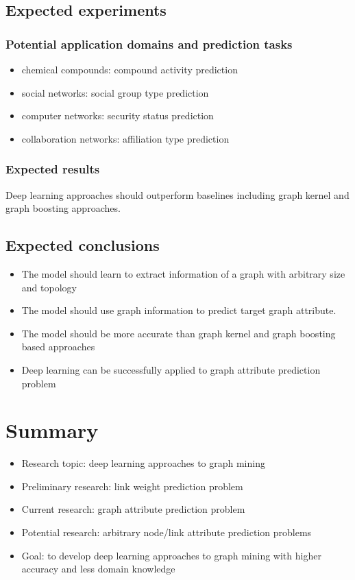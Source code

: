 \documentclass{article}
\begin{document}
\begin{landscape}
\pagebreak
\subsection{Expected experiments}

\subsubsection{Potential application domains and prediction tasks}
\begin{itemize}
	\item chemical compounds: compound activity prediction
	\item social networks: social group type prediction
	\item computer networks: security status prediction
	\item collaboration networks: affiliation type prediction
\end{itemize}

\subsubsection{Expected results}
Deep learning approaches should outperform baselines including graph kernel and graph boosting approaches.

\pagebreak
\subsection{Expected conclusions}
\begin{itemize}
	\item The model should learn to extract information of a graph with arbitrary size and topology
	\item The model should use graph information to predict target graph attribute.
	\item The model should be more accurate than graph kernel and graph boosting based approaches
	\item Deep learning can be successfully applied to graph attribute prediction problem
\end{itemize}

\pagebreak
\section{Summary}
\begin{itemize}
	\item Research topic: deep learning approaches to graph mining
	\item Preliminary research: link weight prediction problem
	\item Current research: graph attribute prediction problem
	\item Potential research: arbitrary node/link attribute prediction problems
	\item Goal: to develop deep learning approaches to graph mining with higher accuracy and less domain knowledge
\end{itemize}


\end{landscape}
\end{document}
